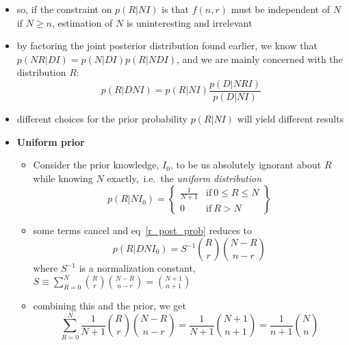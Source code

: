 \documentclass[../jaynes_prob_theory_notes.tex]{subfiles}
\begin{document}
\begin{itemize}
\begin{itemize}
\begin{equation}
                    \end{equation}
            \end{itemize}
        \item so, if the constraint on $p(R|NI)$ is that $f(n,r)$ must be independent of $N$ if $N \geq n$, estimation of $N$ is uninteresting and irrelevant 
        \item by factoring the joint posterior distribution found earlier, we know that $p(NR|DI) = p(N|DI)p(R|NDI)$, and we are mainly concerned with the distribution $R$:
            \begin{equation}
                \label{r_post_prob}
                p(R|DNI) = p(R|NI) \frac{p(D|NRI)}{p(D|NI)}
            \end{equation}
        \item different choices for the prior probability $p(R|NI)$ will yield different results
        \item \textbf{Uniform prior}
            \begin{itemize}
                \item Consider the prior knowledge, $I_0$, to be us absolutely ignorant about $R$ while knowing $N$ exactly,\ i.e.\ the \textit{uniform distribution}
                    \begin{equation*}
                        p(R|NI_0) = \left \{ \begin{matrix} \frac{1}{N+1} & \mathrm{if}~0 \leq R \leq N \\ 0 & \mathrm{if}~R > N \end{matrix} \right \}
                    \end{equation*}
                \item some terms cancel and eq~\ref{r_post_prob} reduces to 
                    \begin{equation*}
                        p(R|DNI_0) = S^{-1} \binom{R}{r} \binom{N-R}{n-r}
                    \end{equation*}
                    where $S^{-1}$ is a normalization constant, $S \equiv \sum^{N}_{R=0} \binom{R}{r} \binom{N-R}{n-r} = \binom{N+1}{n+1}$
                \item combining this and the prior, we get
                    \begin{equation*}
                        \sum^{N}_{R=0} \frac{1}{N+1} \binom{R}{r} \binom{N-R}{n-r} = \frac{1}{N+1} \binom{N+1}{n+1} = \frac{1}{n+1} \binom{N}{n}
                    \end{equation*}
                    \begin{itemize}

\end{itemize}
\end{itemize}
\end{itemize}
\end{document}
